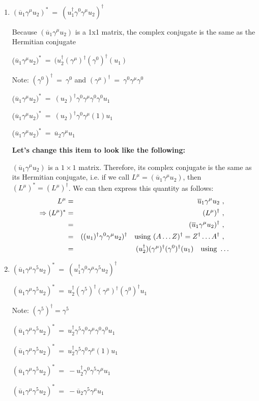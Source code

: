 \documentclass[12pt]{article}
\def \bea{\begin{eqnarray}}
\def \eea{\end{eqnarray}}
\def \nn{\nonumber}
\def \nl{\nn \\}
\def \ou{\overline{u}}
\def \ga{\gamma}
\begin{document}
\begin{enumerate}

\item $(\overline{u}_1\ga^\mu u_2)^* ~=~(u_1^\dag \ga^0 \ga^\mu u_2)^\dag $

Because $(\overline{u}_1\ga^\mu u_2)$ is a 1x1 matrix, the complex conjugate is the same as the Hermitian conjugate

 ($\overline{u}_1\ga^\mu u_2)^* ~=~ (u_2^\dag (\ga^\mu)^\dag (\ga^0)^\dag (u_1) $

 Note: $(\ga^0)^\dag~=~\ga^0$ and $(\ga^\mu)^\dag~=~ \ga^0\ga^\mu\ga^0$

 ($\overline{u}_1\ga^\mu u_2)^* ~=~ (u_2)^\dag \ga^0\ga^\mu\ga^0 \ga^0 u_1 $

 ($\overline{u}_1\ga^\mu u_2)^* ~=~ (u_2)^\dag \ga^0 \ga^\mu (1) u_1 $

 ($\overline{u}_1\ga^\mu u_2)^* ~=~ \overline{u}_2 \ga^\mu u_1 $
 
\textbf{Let's change this item to look like the following: }

$(\ou_1\ga^\mu u_2)$ is a $1\times1$ matrix. Therefore, its complex conjugate is the same as its Hermitian conjugate, i.e. if we call
$L^\mu = (\ou_1\ga^\mu u_2)$, then $(L^\mu)^* = (L^\mu)^\dag$. We can then express this quantity as follows:
\bea
L^\mu &=& \ou_1\ga^\mu u_2 ~,~~ \\
\Rightarrow (L^\mu)^* &=& (L^\mu)^\dag ~,~~ \nl
&=& (\ou_1\ga^\mu u_2)^\dag ~,~~ \nl
&=& ((u_1)^\dag\ga^0\ga^\mu u_2)^\dag ~~~{\rm using}~(A\ldots Z)^\dag = Z^\dag\ldots A^\dag ~,~~ \nl
&=& (u_2^\dag)(\ga^\mu)^\dag(\ga^0)^\dag(u_1) ~~~{\rm using}~\ldots
\eea
%

\item $(\overline{u}_1\ga^\mu \ga^5 u_2)^* ~=~(u_1^\dag \ga^0 \ga^\mu \ga^5  u_2)^\dag $

 $(\overline{u}_1 \ga^\mu \ga^5 u_2)^* ~=~u_2^\dag (\ga^5)^\dag (\ga^\mu)^\dag (\ga^0)^\dag  u_1 $

 Note: $(\ga^5)^\dag = \ga^5$

 $(\overline{u}_1 \ga^\mu \ga^5 u_2)^* ~=~ u_2^\dag \ga^5 \ga^0\ga^\mu\ga^0 \ga^0 u_1$

 $(\overline{u}_1 \ga^\mu \ga^5 u_2)^* ~=~ u_2^\dag \ga^5 \ga^0 \ga^\mu (1) u_1$

 $(\overline{u}_1 \ga^\mu \ga^5 u_2)^* ~=~ -u_2^\dag \ga^0 \ga^5 \ga^\mu u_1$

 $(\overline{u}_1 \ga^\mu \ga^5 u_2)^* ~=~ -\overline{u}_2 \ga^5 \ga^\mu u_1$


\end{enumerate}
\end{document}
